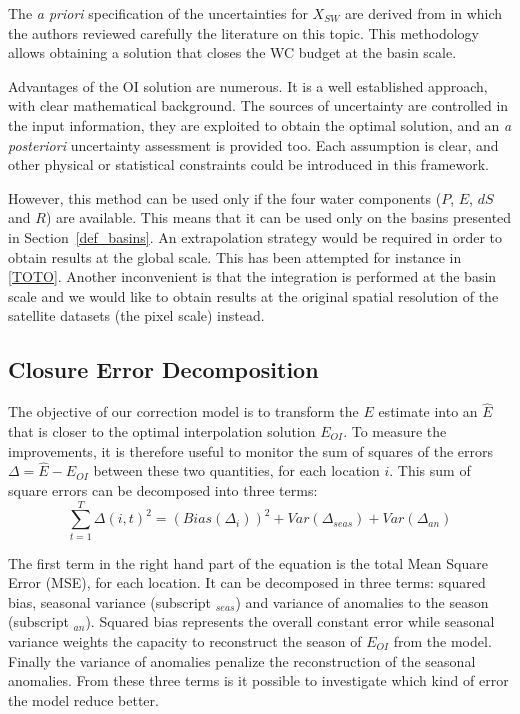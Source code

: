 \documentclass[draft]{agujournal2019}
\begin{document}
The {\it a priori} specification of the uncertainties for $X_{SW}$ are derived from \cite{Dorigo2021} in which the authors reviewed carefully the literature on this topic.
This methodology allows obtaining a solution that closes the WC budget at the basin scale.

Advantages of the OI solution are numerous. It is a well established approach, with clear mathematical background. 
The sources of uncertainty are controlled in the input information, they are exploited to obtain the optimal solution, and an {\it a posteriori} uncertainty assessment is provided too. 
Each assumption is clear, and other physical or statistical constraints could be introduced in this framework. 

However, this method can be used only if the four water components ($P$, $E$, $dS$ and $R$) are available. This means that it can be used only on the basins presented in Section~\ref{def_basins}. 
An extrapolation strategy would be required in order to obtain results at the global scale. This has been attempted for instance in \ref{TOTO}. 
Another inconvenient is that the integration is performed at the basin scale and we would like to obtain results at the original spatial resolution of the satellite datasets (the pixel scale) instead.

\subsection{Closure Error Decomposition}

The objective of our correction model is to transform the $E$ estimate into an $\hat E$ that is closer to the optimal interpolation solution $E_{OI}$. To measure the improvements, it is therefore useful to monitor the sum of squares of the errors $\Delta = \hat E - E_{OI}$ between these two quantities, for each location $i$.
This sum of square errors can be decomposed into three terms:
\begin{equation}
\sum_{t=1}^T {\Delta(i,t)}^2 =   \left(Bias\left(\Delta_i  \right) \right)^2 + Var\left( \Delta_{seas} \right) + Var\left( \Delta_{an} \right)
\end{equation}

The first term in the right hand part of the equation is the total Mean Square Error (MSE), for each location. 
It can be decomposed in three terms: squared bias, seasonal variance (subscript $_{seas}$) and variance of anomalies to the season (subscript $_{an}$).
 Squared bias represents the overall constant error while seasonal variance weights the capacity to reconstruct the season of $E_{OI}$ from the model. 
Finally the variance of anomalies penalize the reconstruction of the seasonal anomalies. 
From these three terms is it possible to investigate which kind of error the model reduce better.
\end{document}
